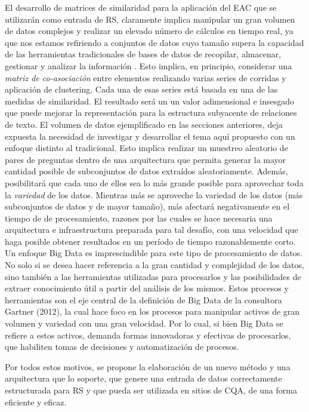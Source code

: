 \bigskip El desarrollo de matrices de similaridad para la aplicación del EAC que se utilizarán como entrada de RS, claramente implica manipular un gran volumen de datos complejos y realizar un elevado número de cálculos en tiempo real, ya que nos estamos refiriendo a conjuntos de datos cuyo tamaño supera la capacidad de las herramientas tradicionales de bases de datos de recopilar, almacenar, gestionar y analizar la información \citep{de2016mineria}. Esto implica, en principio, considerar una \textit{matriz de co-asociación} entre elementos realizando varias series de corridas y aplicación de clustering. Cada una de esas series está basada en una de las medidas de similaridad. El resultado será un un valor adimensional e insesgado que puede mejorar la representación para la estructura subyacente de relaciones de texto. El volumen de datos ejemplificado en las secciones anteriores, deja expuesta la necesidad de investigar y desarrollar el tema aquí propuesto con un enfoque distinto al tradicional. Esto implica realizar un muestreo aleatorio de pares de preguntas dentro de una arquitectura que permita generar la mayor cantidad posible de subconjuntos de datos extraídos aleatoriamente. Además, posibilitará que cada uno de ellos sea lo más grande posible para aprovechar toda la \textit{variedad} de los datos. Mientras más se aproveche la variedad de los datos (más subconjuntos de datos y de mayor tamaño), más afectará negativamente en el tiempo de de procesamiento, razones por las cuales se hace necesaria una arquitectura e infraestructura preparada para tal desafío, con una velocidad que haga posible obtener resultados en un período de tiempo razonablemente corto. Un enfoque Big Data es imprescindible  para este tipo de procesamiento de datos. No solo si se desea hacer referencia a la gran cantidad y complejidad de los datos, sino también a las herramientas utilizadas para procesarlos y las posibilidades de extraer conocimiento útil a partir del análisis de los mismos. Estos procesos y herramientas son el eje central de la definición de Big Data de la consultora Gartner (2012), la cual hace foco en los procesos para manipular activos de gran volumen y variedad con una gran velocidad. Por lo cual, si bien Big Data se refiere a estos activos, demanda formas innovadoras y efectivas de procesarlos, que habiliten tomas de decisiones y automatización de procesos.

\bigskip Por todos estos motivos, se propone la elaboración de un nuevo método y una arquitectura que lo soporte, que genere una entrada de datos correctamente estructurada para RS y que pueda ser utilizada en sitios de CQA, de una forma eficiente y eficaz.


